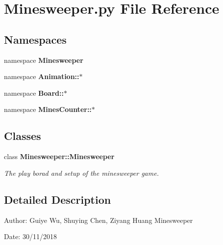 \section{Minesweeper.py File Reference}
\label{Minesweeper_8py}
\subsection*{Namespaces}
\begin{CompactItemize}
\item 
namespace \textbf{Minesweeper}
\item 
namespace \textbf{Animation::$\ast$}
\item 
namespace \textbf{Board::$\ast$}
\item 
namespace \textbf{Mines\-Counter::$\ast$}
\end{CompactItemize}
\subsection*{Classes}
\begin{CompactItemize}
\item 
class \bf{Minesweeper::Minesweeper}
\begin{CompactList}\small\item\em The play borad and setup of the minesweeper game. \item\end{CompactList}\end{CompactItemize}


\subsection{Detailed Description}
\begin{Desc}
\item[Author:]Guiye Wu, Shuying Chen, Ziyang Huang  Minesweeper \end{Desc}
\begin{Desc}
\item[Date:]30/11/2018 \end{Desc}
